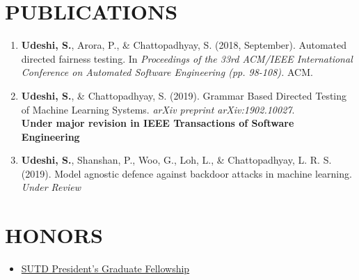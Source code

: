 \documentclass[margin]{res}
\begin{document}
\begin{resume}
\begin{itemize}
                     \end{itemize} 
                     
%                  
		   
\section{PUBLICATIONS}
        \begin{enumerate}
			\item \textbf{Udeshi, S.}, Arora, P., \& Chattopadhyay, S. (2018, September). Automated directed fairness testing. In \textit{Proceedings of the 33rd ACM/IEEE International Conference on Automated Software Engineering (pp. 98-108).} ACM.            
            \item \textbf{Udeshi, S.}, \& Chattopadhyay, S. (2019). Grammar 	Based Directed Testing of Machine Learning Systems. \textit{arXiv preprint arXiv:1902.10027}. \\ \textbf{Under major revision in IEEE Transactions of Software Engineering}
            \item \textbf{Udeshi, S.}, Shanshan, P., Woo, G., Loh, L., \& Chattopadhyay, L. R. S. (2019). Model agnostic defence against backdoor attacks in machine learning. \textit{Under Review}   
        \end{enumerate}
 

                 

\section{HONORS} 
	\begin{itemize}
		\item [] \href{https://www.sutd.edu.sg/Admissions/Graduate/PhD-Programmes/SUTD-PhD-Programme/Financial}{SUTD President's Graduate Fellowship}
	\end{itemize}

 
\end{resume} 
\end{document}
